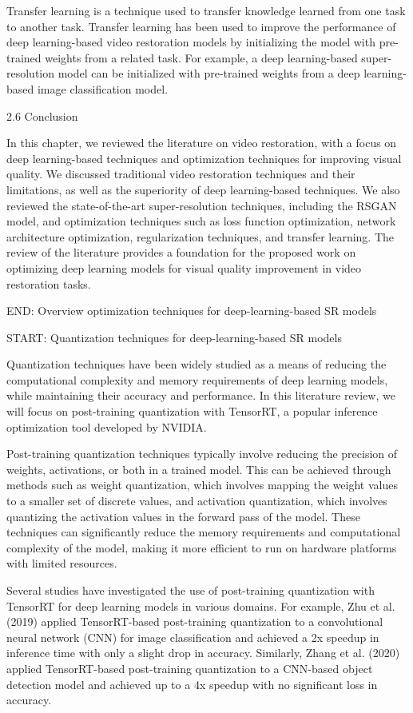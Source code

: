Transfer learning is a technique used to transfer knowledge learned from one task to another task. Transfer learning has been used to improve the performance of deep learning-based video restoration models by initializing the model with pre-trained weights from a related task. For example, a deep learning-based super-resolution model can be initialized with pre-trained weights from a deep learning-based image classification model.

2.6 Conclusion

In this chapter, we reviewed the literature on video restoration, with a focus on deep learning-based techniques and optimization techniques for improving visual quality. We discussed traditional video restoration techniques and their limitations, as well as the superiority of deep learning-based techniques. We also reviewed the state-of-the-art super-resolution techniques, including the RSGAN model, and optimization techniques such as loss function optimization, network architecture optimization, regularization techniques, and transfer learning. The review of the literature provides a foundation for the proposed work on optimizing deep learning models for visual quality improvement in video restoration tasks.

END: Overview optimization techniques for deep-learning-based SR models

START: Quantization techniques for deep-learning-based SR models

Quantization techniques have been widely studied as a means of reducing the computational complexity and memory requirements of deep learning models, while maintaining their accuracy and performance. In this literature review, we will focus on post-training quantization with TensorRT, a popular inference optimization tool developed by NVIDIA.

Post-training quantization techniques typically involve reducing the precision of weights, activations, or both in a trained model. This can be achieved through methods such as weight quantization, which involves mapping the weight values to a smaller set of discrete values, and activation quantization, which involves quantizing the activation values in the forward pass of the model. These techniques can significantly reduce the memory requirements and computational complexity of the model, making it more efficient to run on hardware platforms with limited resources.

Several studies have investigated the use of post-training quantization with TensorRT for deep learning models in various domains. For example, Zhu et al. (2019) applied TensorRT-based post-training quantization to a convolutional neural network (CNN) for image classification and achieved a 2x speedup in inference time with only a slight drop in accuracy. Similarly, Zhang et al. (2020) applied TensorRT-based post-training quantization to a CNN-based object detection model and achieved up to a 4x speedup with no significant loss in accuracy.

